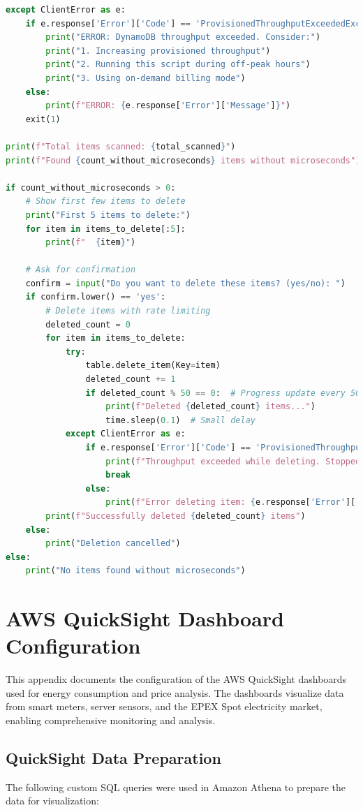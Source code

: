 \begin{lstlisting}[language=Python]
except ClientError as e:
    if e.response['Error']['Code'] == 'ProvisionedThroughputExceededException':
        print("ERROR: DynamoDB throughput exceeded. Consider:")
        print("1. Increasing provisioned throughput")
        print("2. Running this script during off-peak hours")
        print("3. Using on-demand billing mode")
    else:
        print(f"ERROR: {e.response['Error']['Message']}")
    exit(1)

print(f"Total items scanned: {total_scanned}")
print(f"Found {count_without_microseconds} items without microseconds")

if count_without_microseconds > 0:
    # Show first few items to delete
    print("First 5 items to delete:")
    for item in items_to_delete[:5]:
        print(f"  {item}")
    
    # Ask for confirmation
    confirm = input("Do you want to delete these items? (yes/no): ")
    if confirm.lower() == 'yes':
        # Delete items with rate limiting
        deleted_count = 0
        for item in items_to_delete:
            try:
                table.delete_item(Key=item)
                deleted_count += 1
                if deleted_count % 50 == 0:  # Progress update every 50 items
                    print(f"Deleted {deleted_count} items...")
                    time.sleep(0.1)  # Small delay
            except ClientError as e:
                if e.response['Error']['Code'] == 'ProvisionedThroughputExceededException':
                    print(f"Throughput exceeded while deleting. Stopped at {deleted_count} items.")
                    break
                else:
                    print(f"Error deleting item: {e.response['Error']['Message']}")
        print(f"Successfully deleted {deleted_count} items")
    else:
        print("Deletion cancelled")
else:
    print("No items found without microseconds")
\end{lstlisting}

\newpage
\section{AWS QuickSight Dashboard Configuration}
\label{appendix:quicksight-dashboard}

This appendix documents the configuration of the AWS QuickSight dashboards used for energy consumption and price analysis. The dashboards visualize data from smart meters, server sensors, and the EPEX Spot electricity market, enabling comprehensive monitoring and analysis.

\subsection{QuickSight Data Preparation}
The following custom SQL queries were used in Amazon Athena to prepare the data for visualization:

